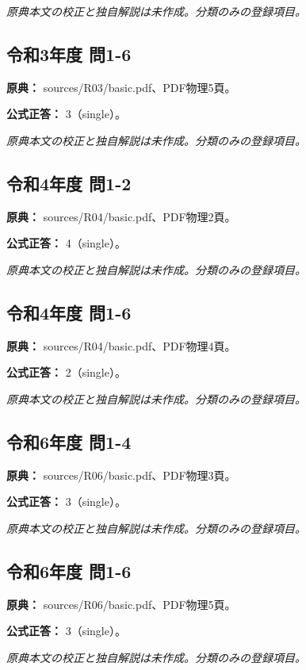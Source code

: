 \par\textit{原典本文の校正と独自解説は未作成。分類のみの登録項目。}

\subsection{令和3年度 問1-6}
\label{q:r03-reg-basic-1-6}

\noindent\textbf{原典：} sources/R03/basic.pdf、PDF物理5頁。

\textbf{公式正答：} 3（single）。

\par\textit{原典本文の校正と独自解説は未作成。分類のみの登録項目。}

\subsection{令和4年度 問1-2}
\label{q:r04-reg-basic-1-2}

\noindent\textbf{原典：} sources/R04/basic.pdf、PDF物理2頁。

\textbf{公式正答：} 4（single）。

\par\textit{原典本文の校正と独自解説は未作成。分類のみの登録項目。}

\subsection{令和4年度 問1-6}
\label{q:r04-reg-basic-1-6}

\noindent\textbf{原典：} sources/R04/basic.pdf、PDF物理4頁。

\textbf{公式正答：} 2（single）。

\par\textit{原典本文の校正と独自解説は未作成。分類のみの登録項目。}

\subsection{令和6年度 問1-4}
\label{q:r06-reg-basic-1-4}

\noindent\textbf{原典：} sources/R06/basic.pdf、PDF物理3頁。

\textbf{公式正答：} 3（single）。

\par\textit{原典本文の校正と独自解説は未作成。分類のみの登録項目。}

\subsection{令和6年度 問1-6}
\label{q:r06-reg-basic-1-6}

\noindent\textbf{原典：} sources/R06/basic.pdf、PDF物理5頁。

\textbf{公式正答：} 3（single）。

\par\textit{原典本文の校正と独自解説は未作成。分類のみの登録項目。}
